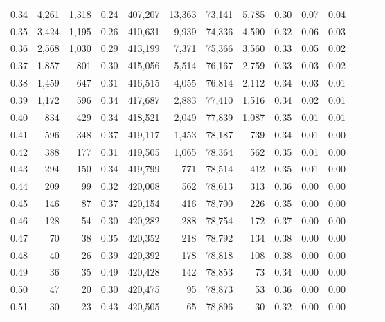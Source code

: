 \begin{tabular}{rrrrrrrrrrrrrr}
0.34 &   4,261 &  1,318 &  0.24 &  407,207 &   13,363 &  73,141 &   5,785 &  0.30 &  0.07 &      0.04 \\
0.35 &   3,424 &  1,195 &  0.26 &  410,631 &    9,939 &  74,336 &   4,590 &  0.32 &  0.06 &      0.03 \\
0.36 &   2,568 &  1,030 &  0.29 &  413,199 &    7,371 &  75,366 &   3,560 &  0.33 &  0.05 &      0.02 \\
0.37 &   1,857 &    801 &  0.30 &  415,056 &    5,514 &  76,167 &   2,759 &  0.33 &  0.03 &      0.02 \\
0.38 &   1,459 &    647 &  0.31 &  416,515 &    4,055 &  76,814 &   2,112 &  0.34 &  0.03 &      0.01 \\
0.39 &   1,172 &    596 &  0.34 &  417,687 &    2,883 &  77,410 &   1,516 &  0.34 &  0.02 &      0.01 \\
0.40 &     834 &    429 &  0.34 &  418,521 &    2,049 &  77,839 &   1,087 &  0.35 &  0.01 &      0.01 \\
0.41 &     596 &    348 &  0.37 &  419,117 &    1,453 &  78,187 &     739 &  0.34 &  0.01 &      0.00 \\
0.42 &     388 &    177 &  0.31 &  419,505 &    1,065 &  78,364 &     562 &  0.35 &  0.01 &      0.00 \\
0.43 &     294 &    150 &  0.34 &  419,799 &      771 &  78,514 &     412 &  0.35 &  0.01 &      0.00 \\
0.44 &     209 &     99 &  0.32 &  420,008 &      562 &  78,613 &     313 &  0.36 &  0.00 &      0.00 \\
0.45 &     146 &     87 &  0.37 &  420,154 &      416 &  78,700 &     226 &  0.35 &  0.00 &      0.00 \\
0.46 &     128 &     54 &  0.30 &  420,282 &      288 &  78,754 &     172 &  0.37 &  0.00 &      0.00 \\
0.47 &      70 &     38 &  0.35 &  420,352 &      218 &  78,792 &     134 &  0.38 &  0.00 &      0.00 \\
0.48 &      40 &     26 &  0.39 &  420,392 &      178 &  78,818 &     108 &  0.38 &  0.00 &      0.00 \\
0.49 &      36 &     35 &  0.49 &  420,428 &      142 &  78,853 &      73 &  0.34 &  0.00 &      0.00 \\
0.50 &      47 &     20 &  0.30 &  420,475 &       95 &  78,873 &      53 &  0.36 &  0.00 &      0.00 \\
0.51 &      30 &     23 &  0.43 &  420,505 &       65 &  78,896 &      30 &  0.32 &  0.00 &      0.00 \\

\end{tabular}
